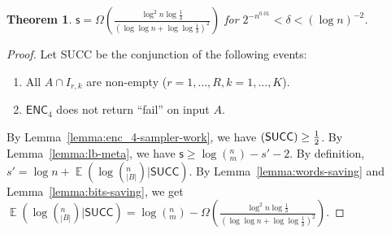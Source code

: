 \documentclass[10pt]{article}
\DeclareMathOperator*{\E}{\mathbb{E}}
\let\Pr\relax
\DeclareMathOperator*{\Pr}{\mathbb{P}}
\newtheorem{theorem}{Theorem}
\newcommand{\success}{\textsf{SUCC}\xspace}
\newcommand{\enc}{\textsf{ENC}\xspace}
\newcommand{\s}{\textsf{s}\xspace}
\begin{document}
\begin{theorem}
  $\s = \Omega(\frac{\log^2 n\log{\frac{1}{\delta}}}{(\log\log n+\log\log \frac{1}{\delta})^2})$ for $2^{-n^{0.01}}<\delta<(\log n)^{-2}$.
\end{theorem}

\begin{proof}
  Let \success be the conjunction of the following events:
  \begin{enumerate}
    \item All $A \cap I_{r,k}$ are non-empty ($r=1,\ldots, R, k=1,\ldots, K$).
    \item $\enc_4$ does not return ``fail'' on input $A$.
  \end{enumerate}
  By Lemma~\ref{lemma:enc_4-sampler-work}, we have $\Pr(\success)\ge \frac{1}{2}$. By Lemma~\ref{lemma:lb-meta}, we have $\s\ge \log (^n_m) - s' -2$. By definition, $s'=\log n + \E(\log (^n_{|B|})|\success)$. By Lemma~\ref{lemma:words-saving} and Lemma~\ref{lemma:bits-saving}, we get $\E(\log (^n_{|B|})|\success)=\log (^n_m)-\Omega(\frac{\log^2 n\log{\frac{1}{\delta}}}{(\log\log n+\log\log \frac{1}{\delta})^2})$. 
\end{proof}



\end{document}
